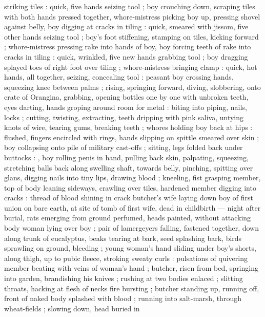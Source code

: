 striking tiles : quick, five hands seizing tool ; boy crouching down, scraping tiles with both hands
pressed together, whore-mistress picking boy up, pressing shovel against belly, boy digging at
cracks in tiling : quick, smeared with jissom, five other hands seizing tool ; boy's foot
stiffening, stamping on tiles, kicking forward ; whore-mistress pressing rake into hands of boy, boy
forcing teeth of rake into cracks in tiling : quick, wrinkled, five new hands grabbing tool ; boy
dragging splayed toes of right foot over tiling ; whore-mistress bringing clamp : quick, hot hands,
all together, seizing, concealing tool : peasant boy crossing hands, squeezing knee between palms ;
rising, springing forward, diving, slobbering, onto crate of Orangina, grabbing, opening bottles one
by one with unbroken teeth, eyes darting, hands groping around room for metal : biting into piping,
nails, locks ; cutting, twisting, extracting, teeth dripping with pink saliva, untying knots of
wire, tearing gums, breaking teeth ; whores holding boy back at hips : flushed, fingers encircled
with rings, hands slipping on spittle smeared over skin ; boy collapsing onto pile of military
cast-offs ; sitting, legs folded back under buttocks : {\td} , boy rolling penis in hand, pulling
back skin, palpating, squeezing, stretching balls back along swelling shaft, towards belly,
pinching, spitting over glans, digging nails into tiny lips, drawing blood ; kneeling, fist grasping
member, top of body leaning sideways, crawling over tiles, hardened member digging into cracks :
thread of blood shining in crack {\slashsemi} butcher's wife laying down boy of first union on bare
earth, at site of tomb of first wife, dead in childbirth --- night after burial, rats emerging from
ground perfumed, heads painted, without attacking body {\dashcom} woman lying over boy ; pair of
lamergeyers falling, fastened together, down along trunk of eucalyptus, beaks tearing at bark, seed
splashing bark, birds sprawling on ground, bleeding ; young woman's hand sliding under boy's shorts,
along thigh, up to pubic fleece, stroking sweaty curls : pulsations of %
quivering member beating with veins of woman's hand ; butcher, risen from bed, springing into
garden, brandishing his knives ; rushing at two bodies enlaced ; slitting throats, hacking at flesh
of necks {\semitwoslash} fire bursting ; butcher standing up, running off, front of naked body
splashed with blood ; running into salt-marsh, through wheat-fields ; slowing down, head buried in
